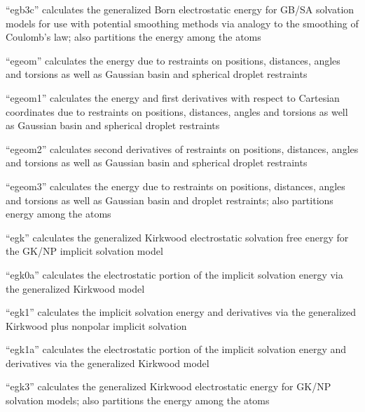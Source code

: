 \documentclass[letterpaper,11pt,english]{sphinxmanual}
\begin{document}

“egb3c” calculates the generalized Born electrostatic energy
for GB/SA solvation models for use with potential smoothing
methods via analogy to the smoothing of Coulomb’s law; also
partitions the energy among the atoms


“egeom” calculates the energy due to restraints on positions,
distances, angles and torsions as well as Gaussian basin and
spherical droplet restraints


“egeom1” calculates the energy and first derivatives
with respect to Cartesian coordinates due to restraints
on positions, distances, angles and torsions as well as
Gaussian basin and spherical droplet restraints


“egeom2” calculates second derivatives of restraints
on positions, distances, angles and torsions as well
as Gaussian basin and spherical droplet restraints


“egeom3” calculates the energy due to restraints on positions,
distances, angles and torsions as well as Gaussian basin and
droplet restraints; also partitions energy among the atoms


“egk” calculates the generalized Kirkwood electrostatic
solvation free energy for the GK/NP implicit solvation model


“egk0a” calculates the electrostatic portion of the implicit
solvation energy via the generalized Kirkwood model


“egk1” calculates the implicit solvation energy and derivatives
via the generalized Kirkwood plus nonpolar implicit solvation


“egk1a” calculates the electrostatic portion of the implicit
solvation energy and derivatives via the generalized Kirkwood
model


“egk3” calculates the generalized Kirkwood electrostatic
energy for GK/NP solvation models; also partitions the
energy among the atoms
\end{document}
